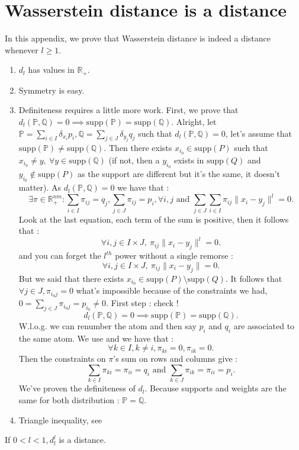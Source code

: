 \documentclass{amsart}
\newcommand{\RR}{\mathbb{R}}
\begin{document}
\section{Wasserstein distance is a distance}\label{distance}
In this appendix, we prove that Wasserstein distance is indeed a distance whenever $l\geq1$.
\begin{enumerate}
    \item $d_l$ has values in $\RR_+$.
    \item Symmetry is easy.
    \item Definiteness requires a little more work. First, we prove that $d_l\left(\mathbb{P},\mathbb{Q}\right)=0\implies \text{supp}\left(\mathbb{P}\right)=\text{supp}\left(\mathbb{Q}\right)$. Alright, let $\mathbb{P}=\sum_{i\in I}\delta_{x_i}p_i,\mathbb{Q}=\sum_{j\in J}\delta_{y_j}q_j$ such that $d_l\left(\mathbb{P},\mathbb{Q}\right)=0$, let's assume that $\text{supp}\left(\mathbb{P}\right)\ne\text{supp}\left(\mathbb{Q}\right)$. Then there exists $x_{i_0}\in \text{supp}\left(P\right)$ such that $x_{i_0}\neq y, \:\forall y\in\text{supp}\left(\mathbb{Q}\right)$ (if not, then a $y_{i_0}$ exists in $\text{supp}\left(Q\right)$ and $y_{i_0}\notin \text{supp}\left(P\right)$ as the support are different but it's the same, it doesn't matter). As $d_l\left(\mathbb{P},\mathbb{Q}\right)=0$ we have that :$$
    \exists\pi\in\RR^{nm}_+ : \sum_{i\in I}\pi_{ij}=q_j, \sum_{j\in J}\pi_{ij}=p_i, \forall i,j \text{ and } \sum_{j\in J}\sum_{i\in I}\pi_{ij}\lVert x_i-y_j\rVert^l=0.
    $$
    Look at the last equation, each term of the sum is positive, then it follows that :
    \begin{equation}\label{useful}
    \forall i,j \in I\times J, \: \pi_{ij}\lVert x_i-y_j\rVert^l=0.
    \end{equation}
    and you can forget the $l^{th}$ power without a single remorse :
    $$
     \forall i,j \in I\times J, \: \pi_{ij}\lVert x_i-y_j\rVert=0.
    $$
    But we said that there exists $x_{i_0}\in\text{supp}\left(P\right)\setminus\text{supp}\left(Q\right)$. It follows that $\forall j\in J, \pi_{i_0j}=0$ what's impossible because of the constraints we had, $0=\sum_{j\in J}\pi_{i_0j}=p_{i_0}\neq0.$ First step : check ! $$d_l\left(\mathbb{P},\mathbb{Q}\right)=0\implies \text{supp}\left(\mathbb{P}\right)=\text{supp}\left(\mathbb{Q}\right).$$
    W.l.o.g. we can renumber the atom and then say $p_i$ and $q_i$ are associated to the same atom. We use  and we have that :
    $$
    \forall k\in I, k\neq i, \pi_{ki}=0, \pi_{ik}=0.
    $$
    Then the constraints on $\pi$'s sum on rows and columns give  : $$ 
    \sum_{k\in I}\pi_{ki}=\pi_{ii}=q_i \text{ and } \sum_{k\in J}\pi_{ik}=\pi_{ii}=p_i.
    $$
    We've proven the definiteness of $d_l$. Because supports and weights are the same for both distribution : $\mathbb{P}=\mathbb{Q}$.
    \item Triangle inequality, see \cite[Proposition 2.2]{peyre_computational_2019}
\end{enumerate}
\begin{remark}
    If $0<l<1, d_l^l$ is a distance.
\end{remark}
\end{document}
